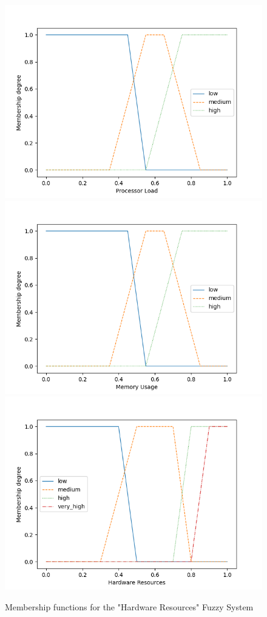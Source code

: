\begin{figure}[!htb]
    \centering
    \hspace*{-1cm}
    
    \includegraphics[width=.33\textwidth]{images/plots/ProcessorLoad.png}\hfill
    \includegraphics[width=.33\textwidth]{images/plots/MemoryUsage.png}\hfill
    \includegraphics[width=.33\textwidth]{images/plots/CpuMemCLP.png}

    \hspace*{-1cm}
    \caption{Membership functions for the "Hardware Resources" Fuzzy System}
    \label{fig:FS_HDR_FSETS}
\end{figure}

